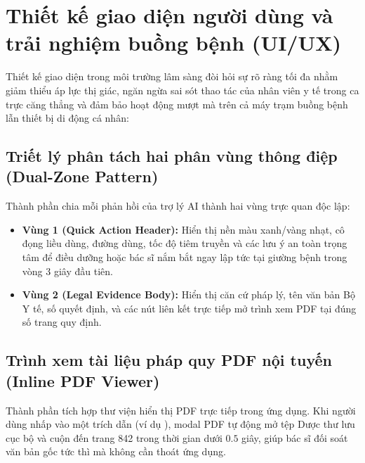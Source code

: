 \section{Thiết kế giao diện người dùng và trải nghiệm buồng bệnh (UI/UX)}
\label{sec:ui_ux_design}

Thiết kế giao diện trong môi trường lâm sàng đòi hỏi sự rõ ràng tối đa nhằm giảm thiểu áp lực thị giác, ngăn ngừa sai sót thao tác của nhân viên y tế trong ca trực căng thẳng và đảm bảo hoạt động mượt mà trên cả máy trạm buồng bệnh lẫn thiết bị di động cá nhân:

\subsection{Triết lý phân tách hai phân vùng thông điệp (Dual-Zone Pattern)}
Thành phần  chia mỗi phản hồi của trợ lý AI thành hai vùng trực quan độc lập:
\begin{itemize}[leftmargin=1.5em]
    \item \textbf{Vùng 1 (Quick Action Header):} Hiển thị nền màu xanh/vàng nhạt, cô đọng liều dùng, đường dùng, tốc độ tiêm truyền và các lưu ý an toàn trọng tâm để điều dưỡng hoặc bác sĩ nắm bắt ngay lập tức tại giường bệnh trong vòng 3 giây đầu tiên.
    \item \textbf{Vùng 2 (Legal Evidence Body):} Hiển thị căn cứ pháp lý, tên văn bản Bộ Y tế, số quyết định, và các nút liên kết trực tiếp mở trình xem PDF tại đúng số trang quy định.
\end{itemize}

\subsection{Trình xem tài liệu pháp quy PDF nội tuyến (Inline PDF Viewer)}
Thành phần  tích hợp thư viện hiển thị PDF trực tiếp trong ứng dụng. Khi người dùng nhấp vào một trích dẫn (ví dụ ), modal PDF tự động mở tệp Dược thư lưu cục bộ và cuộn đến trang 842 trong thời gian dưới $0.5$ giây, giúp bác sĩ đối soát văn bản gốc tức thì mà không cần thoát ứng dụng.

